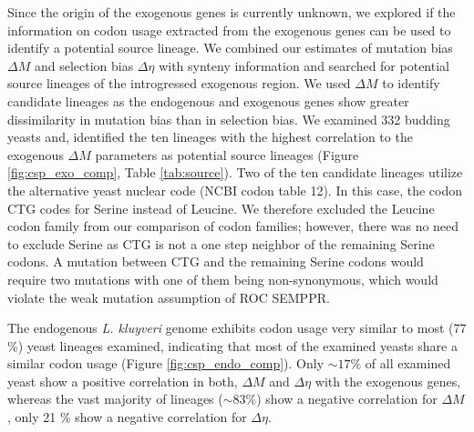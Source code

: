 \documentclass[doublespacing,linenumbers]{bmcart-modified}
\newcommand{\kluyveri}{\textit{L. kluyveri}\xspace}
\newcommand{\ROC}{ROC SEMPPR\xspace}
\newcommand{\DM}{\ensuremath{{\Delta M}}\xspace}
\newcommand{\DE}{\ensuremath{{\Delta \eta}}\xspace}
\begin{document}
Since the origin of the exogenous genes is currently unknown, we explored if the information on codon usage extracted from the exogenous genes can be used to identify a potential source lineage. 
We combined our estimates of mutation bias \DM and selection bias \DE with synteny information and searched for potential source lineages of the introgressed exogenous region.
We used \DM to identify candidate lineages as the endogenous and exogenous genes show greater dissimilarity in mutation bias than in selection bias.
We examined 332 budding yeasts \citep{shen2018} and, identified the ten lineages with the highest correlation to the exogenous \DM parameters as potential source lineages (Figure \ref{fig:csp_exo_comp}, Table \ref{tab:source}).
Two of the ten candidate lineages utilize the alternative yeast nuclear code (NCBI codon table 12). 
In this case, the codon CTG codes for Serine instead of Leucine. 
We therefore excluded the Leucine codon family from our comparison of codon families; however, there was no need to exclude Serine as CTG is not a one step neighbor of the remaining Serine codons.
A mutation between CTG and the remaining Serine codons would require two mutations with one of them being non-synonymous, which would violate the weak mutation assumption of \ROC.

The endogenous \kluyveri genome exhibits codon usage very similar to most (77 \%) yeast lineages examined, indicating that most of the examined yeasts share a similar codon usage (Figure \ref{fig:csp_endo_comp}).
Only $\sim 17 \%$ of all examined yeast show a positive correlation in both, \DM and \DE with the exogenous genes, whereas the vast majority of lineages ($\sim 83 \%$) show a negative correlation for \DM, only 21 \% show a negative correlation for \DE.
\end{document}
